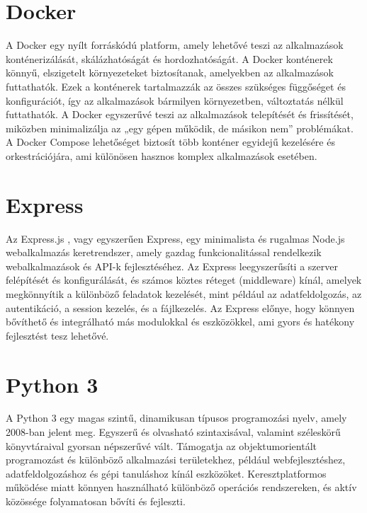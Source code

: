 \section{Docker}
A Docker \cite{DockerAc99:online} egy nyílt forráskódú platform, amely lehetővé teszi az alkalmazások konténerizálását, skálázhatóságát és hordozhatóságát. A Docker konténerek könnyű, elszigetelt környezeteket biztosítanak, amelyekben az alkalmazások futtathatók. Ezek a konténerek tartalmazzák az összes szükséges függőséget és konfigurációt, így az alkalmazások bármilyen környezetben, változtatás nélkül futtathatók. A Docker egyszerűvé teszi az alkalmazások telepítését és frissítését, miközben minimalizálja az „egy gépen működik, de másikon nem” problémákat. A Docker Compose \cite{DockerCo66:online} lehetőséget biztosít több konténer egyidejű kezelésére és orkestrációjára, ami különösen hasznos komplex alkalmazások esetében.

\section{Express}
Az Express.js \cite{ExpressN40:online}, vagy egyszerűen Express, egy minimalista és rugalmas Node.js webalkalmazás keretrendszer, amely gazdag funkcionalitással rendelkezik webalkalmazások és API-k fejlesztéséhez. Az Express leegyszerűsíti a szerver felépítését és konfigurálását, és számos köztes réteget (middleware) kínál, amelyek megkönnyítik a különböző feladatok kezelését, mint például az adatfeldolgozás, az autentikáció, a session kezelés, és a fájlkezelés. Az Express előnye, hogy könnyen bővíthető és integrálható más modulokkal és eszközökkel, ami gyors és hatékony fejlesztést tesz lehetővé.

\section{Python 3}
A Python 3 \cite{AboutPyt99:online} egy magas szintű, dinamikusan típusos programozási nyelv, amely 2008-ban jelent meg. Egyszerű és olvasható szintaxisával, valamint széleskörű könyvtáraival gyorsan népszerűvé vált. Támogatja az objektumorientált programozást és különböző alkalmazási területekhez, például webfejlesztéshez, adatfeldolgozáshoz és gépi tanuláshoz kínál eszközöket. Keresztplatformos működése miatt könnyen használható különböző operációs rendszereken, és aktív közössége folyamatosan bővíti és fejleszti.

